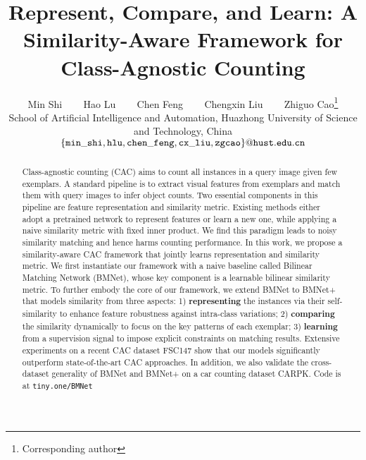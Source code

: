 \documentclass[10pt,twocolumn,letterpaper]{article}
\begin{document}
\title{Represent, Compare, and Learn: A Similarity-Aware Framework for\\Class-Agnostic Counting}

\author{Min Shi ~~~
\quad Hao Lu ~~~
\quad Chen Feng ~~~
\quad Chengxin Liu ~~~ 
\quad Zhiguo Cao\thanks{Corresponding author}\\
School of Artificial Intelligence and Automation, Huazhong University of Science and Technology, China\\
$\tt\footnotesize \{min\_shi, hlu, chen\_feng, cx\_liu, zgcao\}@hust.edu.cn$
}

\maketitle
\begin{abstract}
Class-agnostic counting (CAC) aims to count all instances in a query image given few exemplars. A standard pipeline is to extract visual features from exemplars and match them with query images to infer object counts. Two essential components in this pipeline are feature representation and similarity metric. Existing methods either adopt a pretrained network to represent features or learn a new one, while applying a naive similarity metric with fixed inner product. We find this paradigm leads to noisy similarity matching and hence harms counting performance. In this work, we propose a similarity-aware CAC framework that jointly learns representation and similarity metric. We first instantiate our framework with a naive baseline called Bilinear Matching Network (BMNet),
whose key component is a learnable bilinear similarity metric. To further embody the core of our framework, we extend BMNet to BMNet+ that models similarity from three aspects: 1) \textbf{representing} the instances via their self-similarity to enhance feature robustness against intra-class variations; 2) \textbf{comparing} the similarity dynamically to focus on the key patterns of each exemplar; 3) \textbf{learning} from a supervision signal to impose explicit constraints on matching results.  Extensive experiments on a recent CAC dataset FSC147 show that our models significantly outperform state-of-the-art CAC approaches. In addition, we also validate the cross-dataset
generality of BMNet and BMNet+ on a car counting dataset CARPK. Code is at {\tt tiny.one/BMNet} 

\end{abstract}
\end{document}
